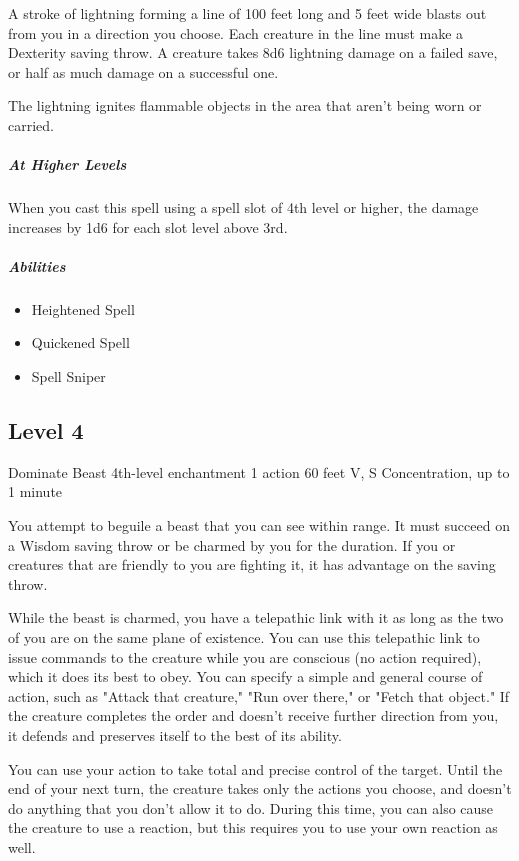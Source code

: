 \documentclass[a4paper,openany,twocolumn]{book}
\begin{document}
A stroke of lightning forming a line of 100 feet long and 5 feet wide blasts out from you in a direction you choose. Each creature in the line must make a Dexterity saving throw. A creature takes 8d6 lightning damage on a failed save, or half as much damage on a successful one.
    
The lightning ignites flammable objects in the area that aren't being worn or carried.
    
\subparagraph*{At Higher Levels} When you cast this spell using a spell slot of 4th level or higher, the damage increases by 1d6 for each slot level above 3rd.

\subparagraph*{Abilities}
\begin{itemize}
  \item Heightened Spell
  \item Quickened Spell
  \item Spell Sniper
\end{itemize}

\subsection*{Level 4}

\DndSpellHeader
  {Dominate Beast}
  {4th-level enchantment}
  {1 action}
  {60 feet}
  {V, S}
  {Concentration, up to 1 minute}

You attempt to beguile a beast that you can see within range. It must succeed on a Wisdom saving throw or be charmed by you for the duration. If you or creatures that are friendly to you are fighting it, it has advantage on the saving throw. 
    
While the beast is charmed, you have a telepathic link with it as long as the two of you are on the same plane of existence. You can use this telepathic link to issue commands to the creature while you are conscious (no action required), which it does its best to obey. You can specify a simple and  general course of action, such as "Attack that creature," "Run over there," or  "Fetch that object." If the creature completes the order and doesn't receive further direction from you, it defends and preserves itself to the best of its ability. 
    
You can use your action to take total and precise control of the  target. Until the end of your next turn, the creature takes only the actions you choose, and doesn't do anything that you don't allow it to do. During this time, you can also cause the creature to use a reaction, but this requires you to use your own reaction as well. 
    
\end{document}
